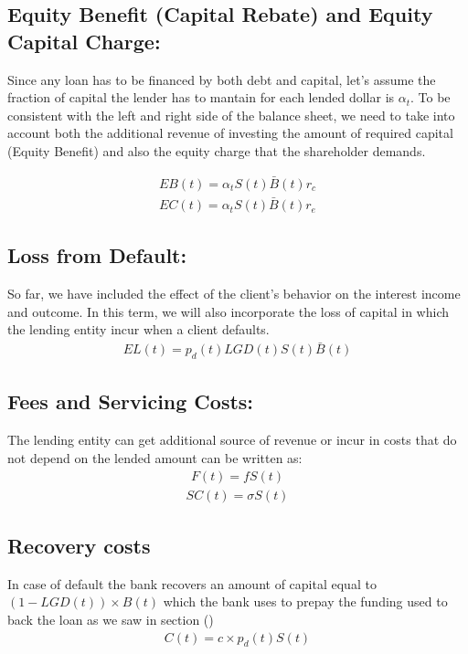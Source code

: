 \subsection{ Equity Benefit (Capital Rebate) and Equity Capital Charge: }
Since any loan has to be financed by both debt and capital, let's assume the fraction of capital the lender has to mantain for each lended dollar is $\alpha_t$. To be consistent with the left and right side of the balance sheet, we need to take into account both the additional revenue of investing the amount of required capital (Equity Benefit) and also the equity charge that the shareholder demands.

\begin{align}
EB(t) = \alpha_t S(t)\bar{ B}(t) r_c
\end{align}
\begin{align}
 EC(t) =  \alpha_t S(t)\bar{ B}(t) r_e
\end{align}

\subsection{ Loss from Default: }
So far, we have included the effect of the client's behavior on the interest income and outcome. In this term, we will also incorporate the loss of capital in which the lending entity incur when a client defaults. 
\begin{align}
EL(t) =  p_d(t)LGD(t)S(t)\bar{ B}(t) 
\end{align}

\subsection{ Fees and Servicing Costs: }
The lending entity can get additional source of revenue or incur in costs that do not depend on the lended amount can be written as:
\begin{align}
F(t) = f S(t)
\end{align}
\begin{align}
SC(t) =  \sigma S(t)
\end{align}


\subsection{Recovery costs}
In case of default the bank recovers an amount of capital equal to $(1-LGD(t)) \times B(t)$ which the bank uses to prepay the funding used to back the loan as we saw in section ()
\begin{align}
C(t) = c\times p_d(t) S(t)
\end{align}



